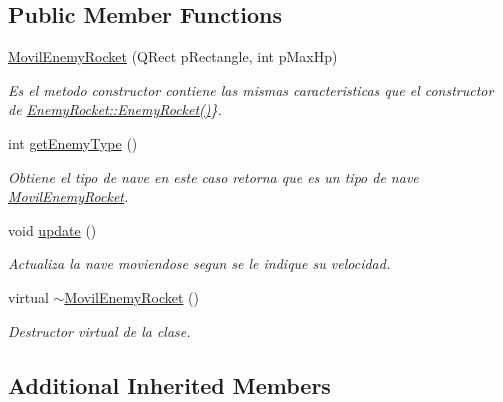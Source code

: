 \subsection*{Public Member Functions}
\begin{DoxyCompactItemize}
\item 
\hyperlink{class_movil_enemy_rocket_a8108d2f9bec6a399e475e474beedf2ef}{Movil\-Enemy\-Rocket} (Q\-Rect p\-Rectangle, int p\-Max\-Hp)
\begin{DoxyCompactList}\small\item\em Es el metodo constructor contiene las mismas caracteristicas que el constructor de \hyperlink{class_enemy_rocket_a602b0809840648ca73f620968499df55}{Enemy\-Rocket\-::\-Enemy\-Rocket()}\}. \end{DoxyCompactList}\item 
int \hyperlink{class_movil_enemy_rocket_a6372ff2e56ce1494f3e3e2420706ef3e}{get\-Enemy\-Type} ()
\begin{DoxyCompactList}\small\item\em Obtiene el tipo de nave en este caso retorna que es un tipo de nave \hyperlink{class_movil_enemy_rocket}{Movil\-Enemy\-Rocket}. \end{DoxyCompactList}\item 
\hypertarget{class_movil_enemy_rocket_af18f4b9b815e7fe4a3817845a644df40}{void \hyperlink{class_movil_enemy_rocket_af18f4b9b815e7fe4a3817845a644df40}{update} ()}\label{class_movil_enemy_rocket_af18f4b9b815e7fe4a3817845a644df40}

\begin{DoxyCompactList}\small\item\em Actualiza la nave moviendose segun se le indique su velocidad. \end{DoxyCompactList}\item 
\hypertarget{class_movil_enemy_rocket_a789ee497234a847d28ff715896485676}{virtual \hyperlink{class_movil_enemy_rocket_a789ee497234a847d28ff715896485676}{$\sim$\-Movil\-Enemy\-Rocket} ()}\label{class_movil_enemy_rocket_a789ee497234a847d28ff715896485676}

\begin{DoxyCompactList}\small\item\em Destructor virtual de la clase. \end{DoxyCompactList}\end{DoxyCompactItemize}
\subsection*{Additional Inherited Members}


